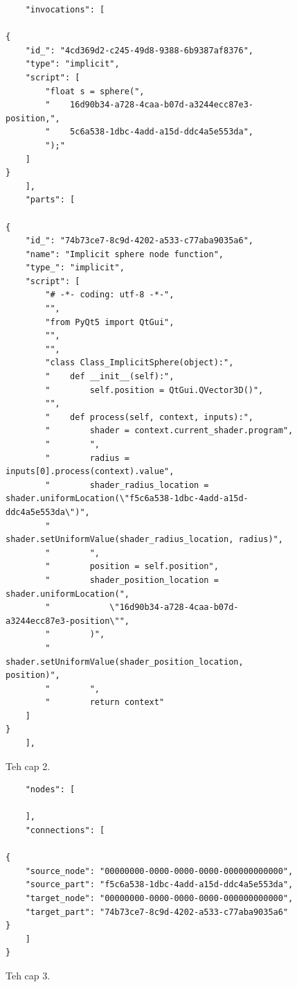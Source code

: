 \documentclass[%
    a4paper,    %
    justified,  %
    nobib,      %
    openany     %
]{tufte-book}
\begin{document}
\begin{figure}
  \begin{verbatim}
    "invocations": [
        
{
    "id_": "4cd369d2-c245-49d8-9388-6b9387af8376",
    "type": "implicit",
    "script": [
        "float s = sphere(",
        "    16d90b34-a728-4caa-b07d-a3244ecc87e3-position,",
        "    5c6a538-1dbc-4add-a15d-ddc4a5e553da",
        ");"
    ]
}
    ],
    "parts": [
        
{
    "id_": "74b73ce7-8c9d-4202-a533-c77aba9035a6",
    "name": "Implicit sphere node function",
    "type_": "implicit",
    "script": [
        "# -*- coding: utf-8 -*-",
        "",
        "from PyQt5 import QtGui",
        "",
        "",
        "class Class_ImplicitSphere(object):",
        "    def __init__(self):",
        "        self.position = QtGui.QVector3D()",
        "",
        "    def process(self, context, inputs):",
        "        shader = context.current_shader.program",
        "        ",
        "        radius = inputs[0].process(context).value",
        "        shader_radius_location = shader.uniformLocation(\"f5c6a538-1dbc-4add-a15d-ddc4a5e553da\")",
        "        shader.setUniformValue(shader_radius_location, radius)",
        "        ",
        "        position = self.position",
        "        shader_position_location = shader.uniformLocation(",
        "            \"16d90b34-a728-4caa-b07d-a3244ecc87e3-position\"",
        "        )",
        "        shader.setUniformValue(shader_position_location, position)",
        "        ",
        "        return context"
    ]
}
    ],
  \end{verbatim}
  \label{fig:node-definition-atomic-type-2}
  \caption{Teh cap 2.}
\end{figure}

\begin{figure}
  \begin{verbatim}
    "nodes": [
        
    ],
    "connections": [
        
{
    "source_node": "00000000-0000-0000-0000-000000000000",
    "source_part": "f5c6a538-1dbc-4add-a15d-ddc4a5e553da",
    "target_node": "00000000-0000-0000-0000-000000000000",
    "target_part": "74b73ce7-8c9d-4202-a533-c77aba9035a6"
}
    ]
}
  \end{verbatim}
  \label{fig:node-definition-atomic-type-3}
  \caption{Teh cap 3.}
\end{figure}
\end{document}
